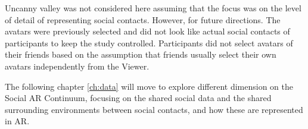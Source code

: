 Uncanny valley was not considered here assuming that the focus was on the level of detail of representing social contacts. However, for future directions. The avatars were previously selected and did not look like actual social contacts of participants to keep the study controlled. Participants did not select avatars of their friends based on the assumption that friends usually select their own avatars independently from the Viewer. 

The following chapter \ref{ch:data} will move to explore different dimension on the Social AR Continuum, focusing on the shared social data and the shared surrounding environments between social contacts, and how these are represented in AR. 


